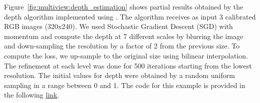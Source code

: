 Figure~\ref{fig:multiview:depth_estimation} shows partial results obtained by the depth algorithm implemented using \lib. The algorithm receives as input 3 calibrated RGB images (320x240). We used Stochastic Gradient Descent (SGD) with momentum and compute the depth at 7 different scales by blurring the image and down-sampling the resolution by a factor of 2 from the previous size. To compute the loss, we up-sample  to the original size using bilinear interpolation.  The refinement at each level was done for 500 iterations starting from the lowest resolution. The initial values for depth were obtained by a random uniform sampling in a range between 0 and 1. The code for this example is provided in the following \underline{\color{blue}\href{https://github.com/kornia/kornia-examples/blob/master/depth_estimation.ipynb}{link}}.


